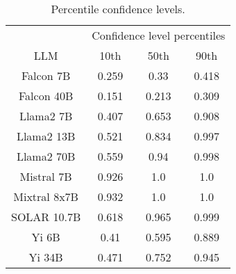 \begin{table*}
\centering
\begin{tabular}{c|c|c|c}
& \multicolumn{3}{c}{Confidence level percentiles} \\ 
LLM & 10th & 50th & 90th\\ \hline
Falcon 7B & 0.259 & 0.33 & 0.418\\
Falcon 40B & 0.151 & 0.213 & 0.309\\
Llama2 7B & 0.407 & 0.653 & 0.908\\
Llama2 13B & 0.521 & 0.834 & 0.997\\
Llama2 70B & 0.559 & 0.94 & 0.998\\
Mistral 7B & 0.926 & 1.0 & 1.0\\
Mixtral 8x7B & 0.932 & 1.0 & 1.0\\
SOLAR 10.7B & 0.618 & 0.965 & 0.999\\
Yi 6B & 0.41 & 0.595 & 0.889\\
Yi 34B & 0.471 & 0.752 & 0.945\\
\hline
\end{tabular}
\caption{Percentile confidence levels.}
\label{tab:percentile_conf}
\end{table*}
